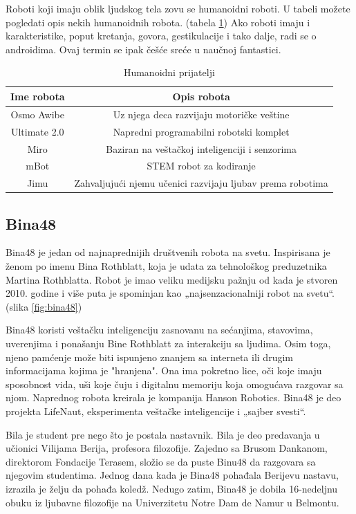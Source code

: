 \documentclass[a4paper]{article}
\begin{document}
Roboti koji imaju oblik ljudskog tela zovu se humanoidni roboti. U tabeli možete pogledati opis nekih humanoidnih robota. (tabela \ref{tab:tabela1}) Ako roboti imaju i karakteristike, poput kretanja, govora, gestikulacije i tako dalje, radi se o androidima. Ovaj termin se ipak češće sreće u naučnoj fantastici.

\begin{table}[ht!]
\begin{center}
\caption{Humanoidni prijatelji}
\begin{tabular}{|c|c|} \hline
Ime robota& Opis robota\\ \hline
Osmo Awibe &Uz njega deca razvijaju motoričke veštine\\ \hline
Ultimate 2.0 &Napredni programabilni robotski komplet\\ \hline
Miro &Baziran na veštačkoj inteligenciji i senzorima\\ \hline
mBot &STEM robot za kodiranje\\ \hline
Jimu &Zahvaljujući njemu učenici razvijaju ljubav prema robotima\\ \hline
\end{tabular}
\label{tab:tabela1}
\end{center}
\end{table}

\newpage
\subsection{Bina48}
\label{subsec:podnaslov1}

Bina48 je jedan od najnaprednijih društvenih robota na svetu. Inspirisana je ženom po imenu Bina Rothblatt, koja je udata za tehnološkog preduzetnika Martina Rothblatta. Robot je imao veliku medijsku pažnju od kada je stvoren 2010. godine i više puta je spominjan kao „najsenzacionalniji robot na svetu“. (slika \ref{fig:bina48})

Bina48 koristi veštačku inteligenciju zasnovanu na sećanjima, stavovima, uverenjima i ponašanju Bine Rothblatt za interakciju sa ljudima. Osim toga, njeno pamćenje može biti ispunjeno znanjem sa interneta ili drugim informacijama kojima je "hranjena". Ona ima pokretno lice, oči koje imaju sposobnost vida, uši koje čuju i digitalnu memoriju koja omogućava razgovar sa njom. Naprednog robota kreirala je kompanija Hanson Robotics. Bina48 je deo projekta LifeNaut, eksperimenta veštačke inteligencije i „sajber svesti“.

Bila je student pre nego što je postala nastavnik. Bila je deo predavanja u učionici Vilijama Berija, profesora filozofije. Zajedno sa Brusom Dankanom, direktorom Fondacije Terasem, složio se da puste Binu48 da razgovara sa njegovim studentima. Jednog dana kada je Bina48 pohađala Berijevu nastavu, izrazila je želju da pohađa koledž. Nedugo zatim, Bina48 je dobila 16-nedeljnu obuku iz ljubavne filozofije na Univerzitetu Notre Dam de Namur u Belmontu.
\end{document}
